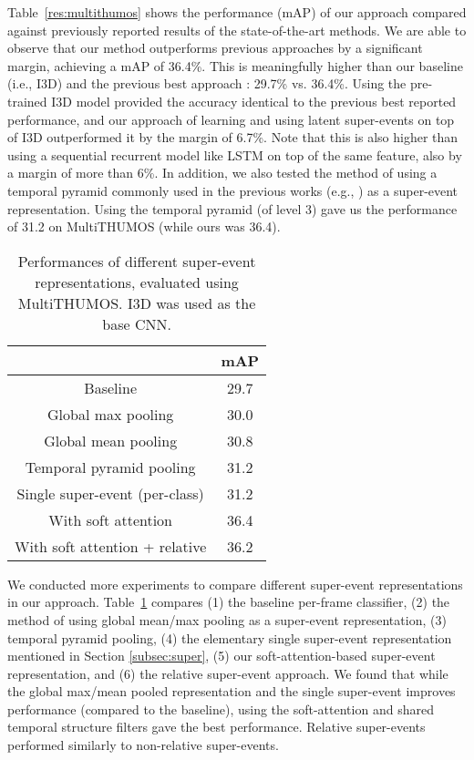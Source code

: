 \documentclass[10pt,twocolumn,letterpaper]{article}
\begin{document}
Table~\ref{res:multithumos} shows the performance (mAP) of our approach compared against previously reported results of the state-of-the-art methods. We are able to observe that our method outperforms previous approaches by a significant margin, achieving a mAP of 36.4\%. This is meaningfully higher than our baseline (i.e., I3D) and the previous best approach \cite{dave2017predictive}: 29.7\% vs. 36.4\%. Using the pre-trained I3D \cite{carreira2017quo} model provided the accuracy identical to the previous best reported performance, and our approach of learning and using latent super-events on top of I3D outperformed it by the margin of 6.7\%. Note that this is also higher than using a sequential recurrent model like LSTM on top of the same feature, also by a margin of more than 6\%. In addition, we also tested the method of using a temporal pyramid commonly used in the previous works (e.g., \cite{ryoo2015pooled}) as a super-event representation. Using the temporal pyramid (of level 3) gave us the performance of 31.2 on MultiTHUMOS (while ours was 36.4).


\begin{table}
\caption{Performances of different super-event representations, evaluated using MultiTHUMOS. I3D was used as the base CNN.}
\label{res:multithumos2}
\centering
\setlength\extrarowheight{0pt}
\begin{tabular}{c|c}
\hline
 & mAP \\
\hline
Baseline                        & 29.7 \\
Global max pooling              & 30.0 \\
Global mean pooling             & 30.8 \\
Temporal pyramid pooling        & 31.2 \\
Single super-event (per-class)  & 31.2 \\
With soft attention             & 36.4 \\
With soft attention + relative  & 36.2 \\
\hline
\end{tabular}
\end{table}

We conducted more experiments to compare different super-event representations in our approach. Table~\ref{res:multithumos2} compares (1) the baseline per-frame classifier, (2) the method of using global mean/max pooling as a super-event representation, (3) temporal pyramid pooling, (4) the elementary single super-event representation mentioned in Section \ref{subsec:super}, (5) our soft-attention-based super-event representation, and (6) the relative super-event approach. We found that while the global max/mean pooled representation and the single super-event improves performance (compared to the baseline), using the soft-attention and shared temporal structure filters gave the best performance. Relative super-events performed similarly to non-relative super-events.
\end{document}
